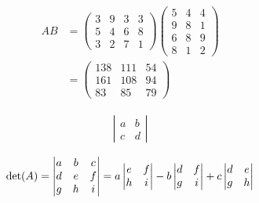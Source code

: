 \documentclass[fleqn,oneside]{article}
\begin{document}
\begin{align*}
AB &= \left(\begin{array}{cccc} 3 & 9 & 3 & 3\\ 5 & 4 & 6 & 8\\ 3 & 2 & 7 & 1 \end{array}\right)
 \left(\begin{array}{ccc} 5 & 4 & 4\\ 9 & 8 & 1\\ 6 & 8 & 9\\ 8 & 1 & 2 \end{array}\right)
 \\
 &= \left(\begin{array}{ccc} 138 & 111 & 54\\ 161 & 108 & 94\\ 83 & 85 & 79 \end{array}\right)
\end{align*}

\begin{align*}
\left| \begin{matrix} a & b  \\ c & d \end{matrix} \right|
\end{align*}
	
	
	
\begin{equation*} 
	\det(A) = \left| \begin{matrix}a & b & c \cr d & e & f \cr g & h & i \end{matrix} \right| = a \left| \begin{matrix} e & f \cr h & i \end{matrix} \right| - b \left| \begin{matrix} d & f \cr g & i  \end{matrix} \right|  +c \left| \begin{matrix} d & e \cr g & h  \end{matrix} \right| 
\end{equation*}
	
	
	
	
	
\end{document}

